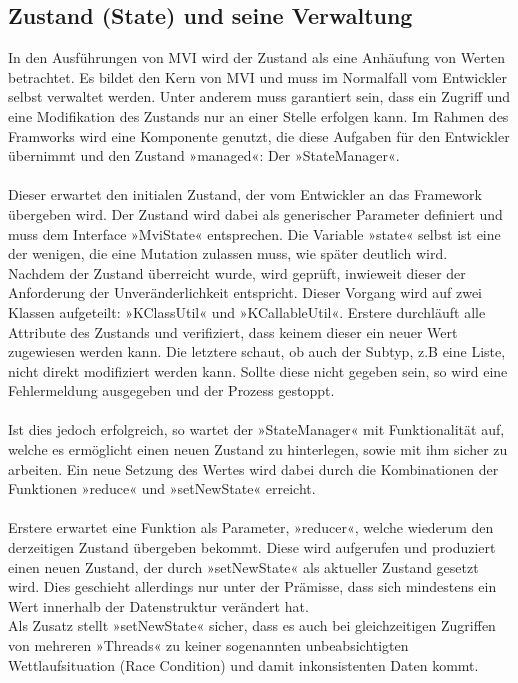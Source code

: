 \subsection{Zustand (State) und seine Verwaltung}
\label{subsec:zustand-und-statemanager}
In den Ausführungen von MVI wird der Zustand als eine Anhäufung von Werten betrachtet. Es bildet den Kern von MVI und muss im Normalfall vom Entwickler selbst verwaltet werden. Unter anderem muss garantiert sein, dass ein Zugriff und eine Modifikation des Zustands nur an einer Stelle erfolgen kann. Im Rahmen des Framworks wird eine Komponente genutzt, die diese Aufgaben für den Entwickler übernimmt und den Zustand »managed«: Der »StateManager«.
\\\\
Dieser erwartet den initialen Zustand, der vom Entwickler an das Framework übergeben wird. Der Zustand wird dabei als generischer Parameter definiert und muss dem Interface »MviState« entsprechen. Die Variable »state« selbst ist eine der wenigen, die eine Mutation zulassen muss, wie später deutlich wird.
\\
Nachdem der Zustand überreicht wurde, wird geprüft, inwieweit dieser der Anforderung der Unveränderlichkeit entspricht. Dieser Vorgang wird auf zwei Klassen aufgeteilt: »KClassUtil« und »KCallableUtil«. Erstere durchläuft alle Attribute des Zustands und verifiziert, dass keinem dieser ein neuer Wert zugewiesen werden kann. Die letztere schaut, ob auch der Subtyp, z.B eine Liste, nicht direkt modifiziert werden kann. Sollte diese nicht gegeben sein, so wird eine Fehlermeldung ausgegeben und der Prozess gestoppt.
\\\\
Ist dies jedoch erfolgreich, so wartet der »StateManager« mit Funktionalität auf, welche es ermöglicht einen neuen Zustand zu hinterlegen, sowie mit ihm sicher zu arbeiten. Ein neue Setzung des Wertes wird dabei durch die Kombinationen der Funktionen »reduce« und »setNewState« erreicht. 
\\\\
Erstere erwartet eine Funktion als Parameter, »reducer«, welche wiederum den derzeitigen Zustand übergeben bekommt. Diese wird aufgerufen und produziert einen neuen Zustand, der durch »setNewState« als aktueller Zustand gesetzt wird. Dies geschieht allerdings nur unter der Prämisse, dass sich mindestens ein Wert innerhalb der Datenstruktur verändert hat.
\\
Als Zusatz stellt »setNewState« sicher, dass es auch bei gleichzeitigen Zugriffen von mehreren »Threads« zu keiner sogenannten unbeabsichtigten Wettlaufsituation (Race Condition) und damit inkonsistenten Daten kommt.
